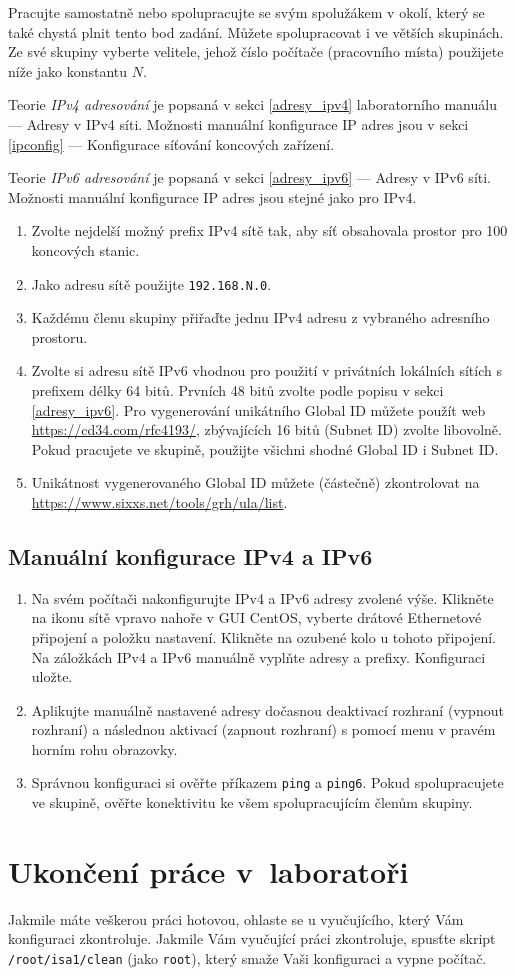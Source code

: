 Pracujte samostatně nebo spolupracujte se svým spolužákem v okolí, který se také
chystá plnit tento bod zadání. Můžete spolupracovat i ve větších skupinách.
Ze své skupiny vyberte velitele, jehož číslo počítače (pracovního místa)
použijete níže jako konstantu $N$.

Teorie \emph{IPv4 adresování} je popsaná v sekci \ref{adresy_ipv4} laboratorního manuálu --- Adresy v IPv4 síti.
Možnosti manuální konfigurace IP adres jsou v sekci \ref{ipconfig} --- Konfigurace síťování koncových zařízení.

Teorie \emph{IPv6 adresování} je popsaná v sekci \ref{adresy_ipv6} --- Adresy v IPv6 síti.
Možnosti manuální konfigurace IP adres jsou stejné jako pro IPv4.

\begin{enumerate}
    \item Zvolte nejdelší možný prefix IPv4 sítě tak, aby síť obsahovala prostor pro 100 koncových stanic.
    \item Jako adresu sítě použijte \texttt{192.168.N.0}.
    \item Každému členu skupiny přiřaďte jednu IPv4 adresu z vybraného adresního prostoru.
    \item Zvolte si adresu sítě IPv6 vhodnou pro použití v privátních lokálních
        sítích s prefixem délky 64 bitů. Prvních 48 bitů zvolte podle popisu v
        sekci \ref{adresy_ipv6}. Pro vygenerování unikátního Global ID můžete
        použít web \url{https://cd34.com/rfc4193/}, zbývajících 16 bitů (Subnet
        ID) zvolte libovolně. Pokud pracujete ve skupině, použijte
        všichni shodné Global ID i Subnet ID.
      \item Unikátnost vygenerovaného Global ID můžete (částečně)
        zkontrolovat na \url{https://www.sixxs.net/tools/grh/ula/list}.
\end{enumerate}

\subsection{Manuální konfigurace IPv4 a IPv6}

\begin{enumerate}
    \item Na svém počítači
      nakonfigurujte IPv4 a IPv6 adresy zvolené výše. Klikněte na ikonu sítě vpravo nahoře v GUI CentOS,
      vyberte drátové Ethernetové připojení a položku nastavení.
      Klikněte na ozubené kolo u tohoto připojení. Na záložkách IPv4 a IPv6
      manuálně vyplňte adresy a prefixy. Konfiguraci uložte.
    \item Aplikujte manuálně nastavené adresy dočasnou deaktivací rozhraní (vypnout rozhraní) a
      následnou aktivací (zapnout rozhraní) s pomocí menu v pravém horním rohu obrazovky.
    \item Správnou konfiguraci si ověřte příkazem {\tt ping} a {\tt ping6}. Pokud
      spolupracujete ve skupině, ověřte konektivitu ke všem spolupracujícím
      členům skupiny.
\end{enumerate}

\section{Ukončení práce v~laboratoři}
Jakmile máte veškerou práci hotovou, ohlaste se u vyučujícího, který Vám
konfiguraci zkontroluje. Jakmile Vám vyučující práci zkontroluje, spusťte skript {\tt /root/isa1/clean} (jako
\texttt{root}), který smaže Vaši konfiguraci a vypne počítač.
